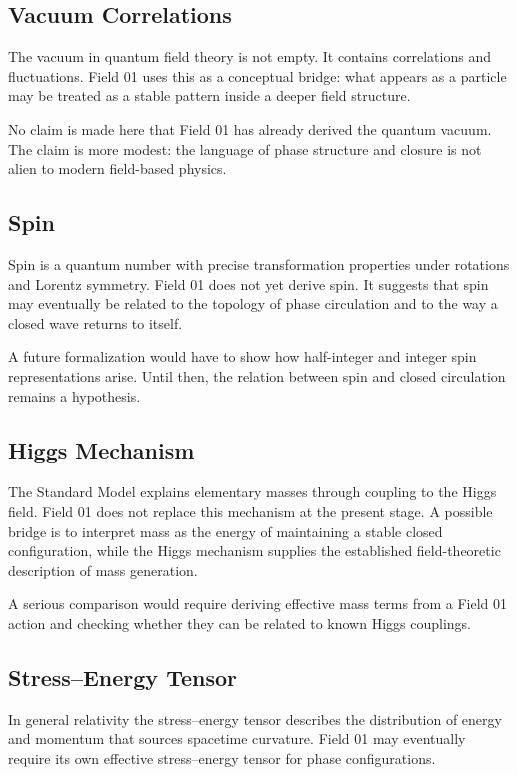 \documentclass[11pt,a4paper]{article}
\begin{document}
\subsection*{Vacuum Correlations}

The vacuum in quantum field theory is not empty. It contains correlations and fluctuations. Field 01 uses this as a conceptual bridge: what appears as a particle may be treated as a stable pattern inside a deeper field structure.

No claim is made here that Field 01 has already derived the quantum vacuum. The claim is more modest: the language of phase structure and closure is not alien to modern field-based physics.

\subsection*{Spin}

Spin is a quantum number with precise transformation properties under rotations and Lorentz symmetry. Field 01 does not yet derive spin. It suggests that spin may eventually be related to the topology of phase circulation and to the way a closed wave returns to itself.

A future formalization would have to show how half-integer and integer spin representations arise. Until then, the relation between spin and closed circulation remains a hypothesis.

\subsection*{Higgs Mechanism}

The Standard Model explains elementary masses through coupling to the Higgs field. Field 01 does not replace this mechanism at the present stage. A possible bridge is to interpret mass as the energy of maintaining a stable closed configuration, while the Higgs mechanism supplies the established field-theoretic description of mass generation.

A serious comparison would require deriving effective mass terms from a Field 01 action and checking whether they can be related to known Higgs couplings.

\subsection*{Stress--Energy Tensor}

In general relativity the stress--energy tensor describes the distribution of energy and momentum that sources spacetime curvature. Field 01 may eventually require its own effective stress--energy tensor for phase configurations.
\end{document}
